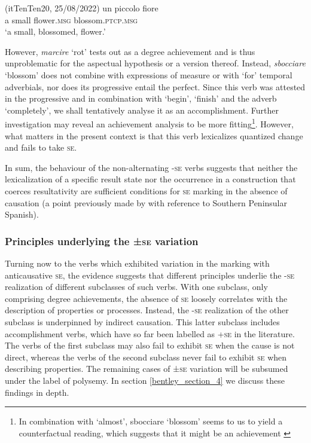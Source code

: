 \documentclass[output=paper,colorlinks,citecolor=brown
]{langscibook}
\begin{document}
\hspace*{\fill}(itTenTen20, 25/08/2022)\quad
\ea \label{bentley_example_19}
    \gll un	piccolo	fiore						   \\
    a			small			flower.\textsc{msg}	blossom.\textsc{ptcp}.\textsc{msg}	 \\
    \glt ‘a small, blossomed, flower.’
\z

However, \textit{marcire} ‘rot’ tests out as a degree achievement and is thus unproblematic for the aspectual hypothesis or a version thereof. Instead, \textit{sbocciare} ‘blossom’ does not combine with expressions of measure or with ‘for’ temporal adverbials, nor does its progressive entail the perfect. Since this verb was attested in the progressive and in combination with ‘begin’, ‘finish’ and the adverb ‘completely’, we shall tentatively analyse it as an accomplishment. Further investigation may reveal an achievement analysis to be more fitting\footnote{In combination with ‘almost’, sbocciare ‘blossom’ seems to us to yield a counterfactual reading, which suggests that it might be an achievement \citep{hay1999scalar}}.  However, what matters in the present context is that this verb lexicalizes quantized change and fails to take \textsc{se}. 

In sum, the behaviour of the non-alternating -\textsc{se} verbs suggests that neither the lexicalization of a specific result state nor the occurrence in a construction that coerces resultativity are sufficient conditions for \textsc{se} marking in the absence of causation (a point previously made by \citet{jimenez2017causativity} with reference to Southern Peninsular Spanish).  

\subsubsection{Principles underlying the ±\textsc{se} variation}
\label{bentley_section_3.3.3}
Turning now to the verbs which exhibited variation in the marking with anticausative \textsc{se}, the evidence suggests that different principles underlie the -\textsc{se} realization of different subclasses of such verbs. With one subclass, only comprising degree achievements, the absence of \textsc{se} loosely correlates with the description of properties or processes. Instead, the -\textsc{se} realization of the other subclass is underpinned by indirect causation. This latter subclass includes accomplishment verbs, which have so far been labelled as +\textsc{se} in the literature. The verbs of the first subclass may also fail to exhibit \textsc{se} when the cause is not direct, whereas the verbs of the second subclass never fail to exhibit \textsc{se} when describing properties. The remaining cases of ±\textsc{se} variation will be subsumed under the label of polysemy. In section \ref{bentley_section_4} we discuss these findings in depth.
\end{document}

